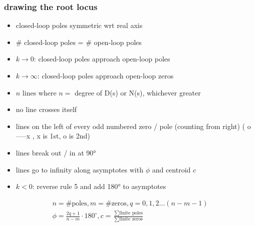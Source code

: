 \subsubsection*{drawing the root locus}
\begin{itemize}
    \item closed-loop poles symmetric wrt real axis
    \item \# closed-loop poles = \# open-loop poles
    \item $k \rightarrow 0$: closed-loop poles approach open-loop poles
    \item $k \rightarrow \infty$: closed-loop poles approach open-loop zeros
    \item $n$ lines where $n =$ degree of D(s) or N(s), whichever greater
    \item no line crosses itself
    \item lines on the left of every odd numbered zero / pole (counting from right) (    o-----x    , x is 1st, o is 2nd)
    \item lines break out / in at 90°
    \item lines go to infinity along asymptotes with $\phi$ and centroid $c$ 
    \item $k < 0$: reverse rule 5 and add 180° to asymptotes
\end{itemize}
\begin{align*}
    n = \# \text{poles}, m = \# \text{zeros}, q = 0, 1, 2 \dots (n-m-1)\\
    \phi = \frac{2q + 1}{n-m} \cdot 180^{\circ}, c = \frac{\sum\text{finite poles}}{\sum\text{finite zeros}}
\end{align*}